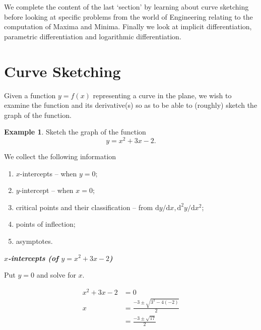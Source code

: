 \documentclass[
  english,
  11pt,
  oneside]{book}
\providecommand{\tightlist}{%
  \setlength{\itemsep}{0pt}\setlength{\parskip}{0pt}}
\newcommand{\slide}{}
\theoremstyle{definition}
\theoremstyle{definition}
\newtheorem{example}{Example}[chapter]
\theoremstyle{definition}
\theoremstyle{definition}
\theoremstyle{remark}
\begin{document}
We complete the content of the last `section' by learning about curve sketching before looking at specific problems from the world of Engineering relating to the computation of Maxima and Minima. Finally we look at implicit differentiation, parametric differentiation and logarithmic differentiation.

\slide

\section{Curve Sketching}\label{curve-sketching}

Given a function \(y=f(x)\) representing a curve in the plane, we wish to examine the function and its derivative(s) so as to be able to (roughly) sketch the graph of the function.

\begin{example}
Sketch the graph of the function
\[y = x^2+3x-2.\]
\end{example}

We collect the following information

\begin{enumerate}
\def\labelenumi{\arabic{enumi}.}
\tightlist
\item
  \(x\)-intercepts -- when \(y=0\);
\item
  \(y\)-intercept -- when \(x = 0\);
\item
  critical points and their classification -- from \(\mathrm{d}y/\mathrm{d} x, \mathrm{d}^2y/\mathrm{d}x^2\);
\item
  points of inflection;
\item
  asymptotes.
\end{enumerate}

\slide

\textbf{\emph{\(x\)-intercepts (of \(y = x^2+3x-2\))}}

Put \(y=0\) and solve for \(x\).

\begin{notslides}

\begin{align*}
x^2+3x-2 &= 0\\
x &= \frac{-3\pm\sqrt{3^2-4(-2)}}{2}\\
&=\frac{-3\pm\sqrt{17}}{2}
\end{align*}

\end{notslides}

\begin{slidesonly}

\vfill

\end{slidesonly}
\end{document}
